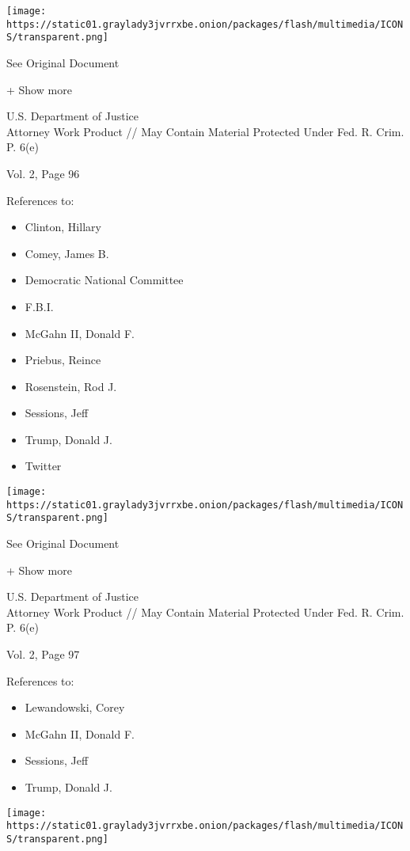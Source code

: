 \texttt{[image: https://static01.graylady3jvrrxbe.onion/packages/flash/multimedia/ICONS/transparent.png]}

See Original Document

+ Show more

U.S. Department of Justice\\
Attorney Work Product // May Contain Material Protected Under Fed. R.
Crim. P. 6(e)

Vol. 2, Page 96

References to:

\begin{itemize}
\tightlist
\item
  Clinton, Hillary
\item
  Comey, James B.
\item
  Democratic National Committee
\item
  F.B.I.
\item
  McGahn II, Donald F.
\item
  Priebus, Reince
\item
  Rosenstein, Rod J.
\item
  Sessions, Jeff
\item
  Trump, Donald J.
\item
  Twitter
\end{itemize}

\protect\hyperlink{}{}

\texttt{[image: https://static01.graylady3jvrrxbe.onion/packages/flash/multimedia/ICONS/transparent.png]}

See Original Document

+ Show more

U.S. Department of Justice\\
Attorney Work Product // May Contain Material Protected Under Fed. R.
Crim. P. 6(e)

Vol. 2, Page 97

References to:

\begin{itemize}
\tightlist
\item
  Lewandowski, Corey
\item
  McGahn II, Donald F.
\item
  Sessions, Jeff
\item
  Trump, Donald J.
\end{itemize}

\protect\hyperlink{}{}

\texttt{[image: https://static01.graylady3jvrrxbe.onion/packages/flash/multimedia/ICONS/transparent.png]}

